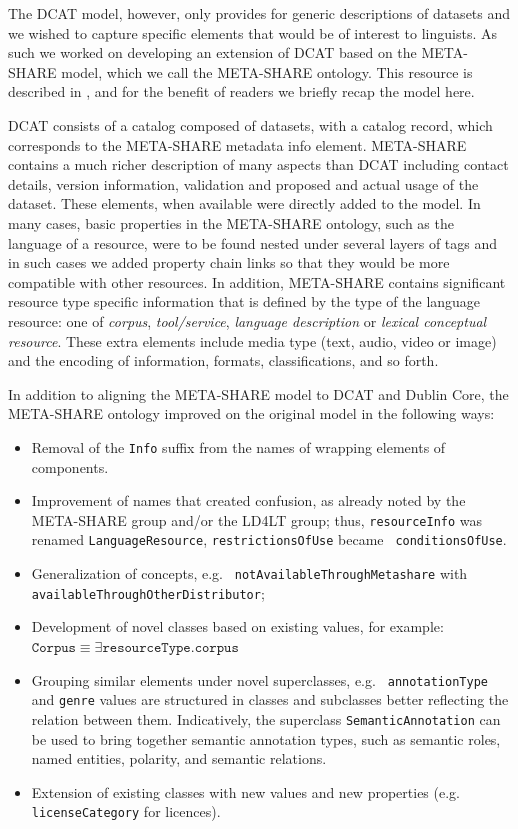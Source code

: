 \documentclass[smallextended]{svjour3}       %
\begin{document}
The DCAT model, however, only provides for generic descriptions of datasets and
we wished to capture specific elements that would be of interest to linguists.
As such we worked on developing an extension of DCAT based on the META-SHARE
model, which we call the META-SHARE ontology. This resource is described in
\cite{mccrae2015ontology}, and for the benefit of readers we briefly recap the
model here.

DCAT consists of a catalog composed of datasets, with a catalog record, which
corresponds to the META-SHARE metadata info element. META-SHARE contains a much
richer description of many aspects than DCAT including contact details, version
information, validation and proposed and actual usage of the dataset. These
elements, when available were directly added to the model. In many cases, basic
properties in the META-SHARE ontology, such as the language of a resource, were
to be found nested under several layers of tags and in such cases we added
property chain links so that they would be more compatible with other resources.
In addition, META-SHARE contains significant resource type specific information
that is defined by the type of the language resource: one of \emph{corpus},
\emph{tool/service}, \emph{language description} or \emph{lexical conceptual
resource}. These extra elements include media type (text, audio, video or image)
and the encoding of information, formats, classifications, and so forth.

In addition to aligning the META-SHARE model to DCAT and Dublin Core, the
META-SHARE ontology improved on the original model in the following ways:

\begin{itemize}
    \item Removal of the {\tt Info} suffix from the names of  wrapping elements of
        components.
    \item Improvement of names that created confusion, as already noted by the
        META-SHARE group and/or the LD4LT group; thus, {\tt resourceInfo} was renamed
        {\tt LanguageResource}, {\tt restrictionsOfUse} became {\tt
        conditionsOfUse}.
    \item Generalization of concepts, e.g. {\tt
        not\-Available\-Through\-Metashare} with {\tt
        avai\-lable\-Through\-Other\-Distributor};
\item Development of novel classes based on existing values, for example:
    \\$\mathtt{Corpus} \equiv \exists \mathtt{resourceType}.\mathtt{corpus}$
\item Grouping similar elements under novel superclasses, e.g. {\tt
    annotationType} and {\tt genre} values are structured in classes and
    subclasses better reflecting the relation between them. Indicatively, the superclass
    {\tt SemanticAnnotation} can be used to bring together semantic annotation types,
    such as semantic roles, named entities, polarity, and semantic relations.
\item Extension of existing classes with new values and new properties
    (e.g. {\tt licenseCategory} for licences).
\end{itemize}
\end{document}

